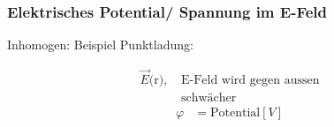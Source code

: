 \subsubsection*{Elektrisches Potential/ Spannung im E-Feld}
Inhomogen:  
Beispiel Punktladung:

\vspace{-1mm}
\begin{minipage}{0.53\linewidth}
    \begin{footnotesize}
        \begin{center}
        \end{center}
    \end{footnotesize}
\end{minipage}
\vspace{1mm}
\begin{minipage}{0.46\linewidth}
    \begin{scriptsize}
        \begin{center}
            \begin{align*}
                \overrightarrow{E}\text{(r), } &\text{E-Feld wird gegen aussen}
                \\ &\text{schwächer}
            \end{align*}
            \begin{align*}
                \varphi &= \text{Potential} [V]
            \end{align*}
        \end{center}
    \end{scriptsize}
\end{minipage}

